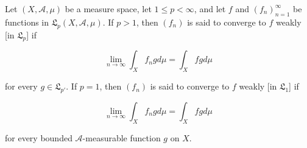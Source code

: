 Let $(X, \mathcal{A}, \mu)$ be a measure space, let $1 \leq p < \infty$, and let $f$ and $(f_n)_{n=1}^{\infty}$ be functions in $\mathfrak{L}_p(X, \mathcal{A}, \mu)$. If $p > 1$, then $(f_n)$ is said to converge to $f$ weakly [in $\mathfrak{L}_p$] if

$$\lim_{n \to \infty} \int_X f_n g d\mu = \int_X f g d\mu$$

for every $g \in \mathfrak{L}_{p'}$. If $p = 1$, then $(f_n)$ is said to converge to $f$ weakly [in $\mathfrak{L}_1$] if

$$\lim_{n \to \infty} \int_X f_n g d\mu = \int_X f g d\mu$$

for every bounded $\mathcal{A}$-measurable function $g$ on $X$.